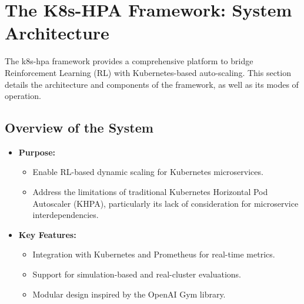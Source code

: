 \documentclass[conference]{IEEEtran}
\begin{document}
\section{The K8s-HPA Framework: System Architecture}
\label{sec:k8s-hpa-framework}

The k8s-hpa framework provides a comprehensive platform to bridge Reinforcement Learning (RL) with Kubernetes-based auto-scaling. This section details the architecture and components of the framework, as well as its modes of operation.

\subsection{Overview of the System}
\begin{itemize}
    \item \textbf{Purpose:}
    \begin{itemize}
        \item Enable RL-based dynamic scaling for Kubernetes microservices.
        \item Address the limitations of traditional Kubernetes Horizontal Pod Autoscaler (KHPA), particularly its lack of consideration for microservice interdependencies.
    \end{itemize}
    \item \textbf{Key Features:}
    \begin{itemize}
        \item Integration with Kubernetes and Prometheus for real-time metrics.
        \item Support for simulation-based and real-cluster evaluations.
        \item Modular design inspired by the OpenAI Gym library.
    \end{itemize}
\end{itemize}
\end{document}
